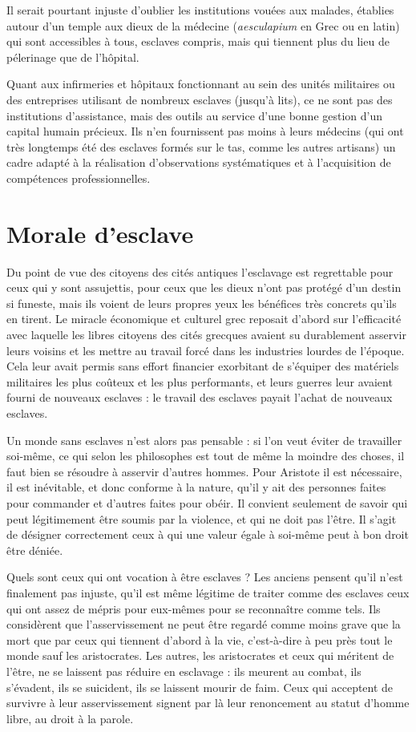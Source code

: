  Il serait pourtant injuste d'oublier les institutions vouées aux malades, établies %
autour d'un temple aux dieux de la médecine (\emph{aesculapium} en Grec ou  en latin) qui sont accessibles à tous, esclaves compris, mais qui tiennent plus du lieu de pélerinage que de l'hôpital. 

 Quant aux infirmeries et hôpitaux fonctionnant au sein des unités militaires ou des entreprises utilisant de nombreux esclaves (jusqu'à  lits), ce ne sont pas des institutions d'assistance, mais des outils au service d'une bonne gestion d'un capital humain précieux. Ils n'en fournissent pas moins à leurs médecins (qui ont très longtemps été des esclaves formés sur le tas, comme les autres artisans) un cadre adapté à la réalisation d'observations systématiques et à l'acquisition de compétences professionnelles.


\section{Morale d'esclave}

 Du point de vue des citoyens des cités antiques l'esclavage est regrettable pour ceux qui y sont assujettis, pour ceux que les dieux n'ont pas protégé d'un destin si funeste, mais ils voient de leurs propres yeux les bénéfices très concrets qu'ils en tirent. Le miracle économique et culturel grec reposait d'abord sur l'efficacité avec laquelle les libres citoyens des cités grecques avaient su durablement asservir leurs voisins et les mettre au travail forcé dans les industries lourdes de l'époque. Cela leur avait permis sans effort financier exorbitant de s'équiper des matériels militaires les plus coûteux et les plus performants, et leurs guerres leur avaient fourni de nouveaux esclaves : le travail des esclaves payait l'achat de nouveaux esclaves. 

 Un monde sans esclaves n'est alors pas pensable : si l'on veut éviter de travailler soi-même, ce qui selon les philosophes est tout de même la moindre des choses, il faut bien se résoudre à asservir d'autres hommes. Pour Aristote il est nécessaire, il est inévitable, et donc conforme à la nature, qu'il y ait des personnes faites pour commander et d'autres faites pour obéir. Il convient seulement de savoir qui peut légitimement être soumis par la violence, et qui ne doit pas l'être. Il s'agit de désigner correctement ceux à qui une valeur égale à soi-même peut à bon droit être déniée. 

 Quels sont ceux qui ont vocation à être esclaves ? Les anciens pensent qu'il n'est finalement pas injuste, qu'il est même légitime de traiter comme des esclaves ceux qui ont assez de mépris pour eux-mêmes pour se reconnaître comme tels. Ils considèrent que l'asservissement ne peut être regardé comme moins grave que la mort que par ceux qui tiennent d'abord à la vie, c'est-à-dire à peu près tout le monde sauf les aristocrates. Les autres, les aristocrates et ceux qui méritent de l'être, ne se laissent pas réduire en esclavage : ils meurent au combat, ils s'évadent, ils se suicident, ils se laissent mourir de faim. Ceux qui acceptent de survivre à leur asservissement signent par là leur renoncement au statut d'homme libre, au droit à la parole. 

